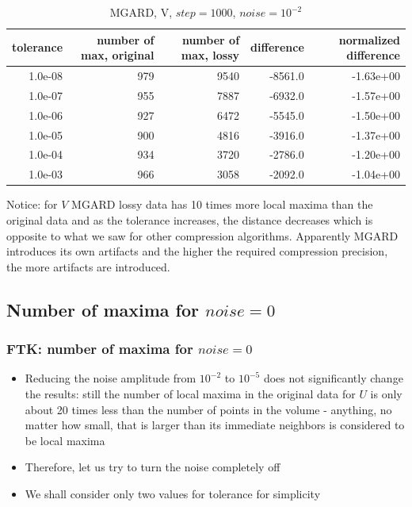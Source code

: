 \begin{frame}[fragile]
  {\tiny
\begin{table}[H]
\centering
\begin{tabular}{|r|r|r|r|r|}
\hline
tolerance &         number of max, original &         number of max, lossy &       difference & normalized difference \\
\hline
  1.0e-08 &              979 &          9540 &         -8561.0 &      -1.63e+00 \\
\hline
  1.0e-07 &              955 &          7887 &         -6932.0 &      -1.57e+00 \\
\hline
  1.0e-06 &              927 &          6472 &         -5545.0 &      -1.50e+00 \\
\hline
  1.0e-05 &              900 &          4816 &         -3916.0 &      -1.37e+00 \\
\hline
  1.0e-04 &              934 &          3720 &         -2786.0 &      -1.20e+00 \\
\hline
  1.0e-03 &              966 &          3058 &         -2092.0 &      -1.04e+00 \\
\hline
\end{tabular}
\caption{MGARD, V, $step = 1000$, $noise = 10^{-2}$}
\label{mgard_v_table}
\end{table}
  }
 {\tiny
  Notice: for $V$ MGARD lossy data has 10 times more local maxima than the original data and as the tolerance increases,
  the distance decreases which is opposite to what we saw for other compression algorithms. Apparently MGARD introduces its own
  artifacts and the higher the required compression precision, the more artifacts are introduced.
 }
 
\end{frame}


\subsection{Number of maxima for $noise = 0$}
\begin{frame}[fragile]
  \frametitle{FTK: number of maxima for $noise = 0$ }
  \begin{itemize}
  \item Reducing the noise amplitude from $10^{-2}$ to $10^{-5}$ does not significantly change the results:
    still the number of local maxima in the original data for $U$ is only about 20 times less than the number of points in
    the volume - anything, no matter how small, that is larger than its immediate neighbors is considered to be local maxima
  \item Therefore, let us try to turn the noise completely off
  \item We shall consider only two values for tolerance for simplicity
  \end{itemize}
\end{frame}


